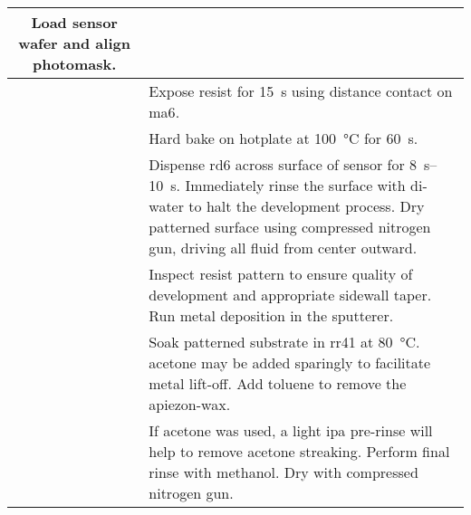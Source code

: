 \documentclass[../main.tex]{subfiles}%
\begin{document}
\begin{table}[p]
\begin{tabu}{ c p{5.50in} }
            Load sensor wafer and align photomask.%
            \\%
            \midrule%
            &%
            Expose resist for \SI{15}{\second} using distance contact on \gls{ma6}.%
            \\%
            \midrule%
            &%
            Hard bake on hotplate at \SI{100}{\celsius} for \SI{60}{\second}.%
            \\%
            \midrule%
            &%
            Dispense \gls{rd6} across surface of sensor for \SIrange{8}{10}{\second}.
            Immediately rinse the surface with \gls{di-water} to halt the development process.
            Dry patterned surface using compressed nitrogen gun, driving all fluid from center outward.%
            \\%
            \midrule%
            &%
            Inspect resist pattern to ensure quality of development and appropriate sidewall taper.
            Run metal deposition in the \gls{sputterer}.%
            \\%
            \midrule%
            &%
            Soak patterned substrate in \gls{rr41} at \SI{80}{\celsius}.
            \Gls{acetone} may be added sparingly to facilitate metal lift-off.
            Add \gls{toluene} to remove the \gls{apiezon-wax}.%
            \\%
            \midrule%
            &%
            If \gls{acetone} was used, a light \gls{ipa} pre-rinse will help to remove \gls{acetone} streaking.
            Perform final rinse with \gls{methanol}.
            Dry with compressed nitrogen gun.%
            \\%
            \bottomrule%
        \end{tabu}%
    \end{table}%
\end{document}
